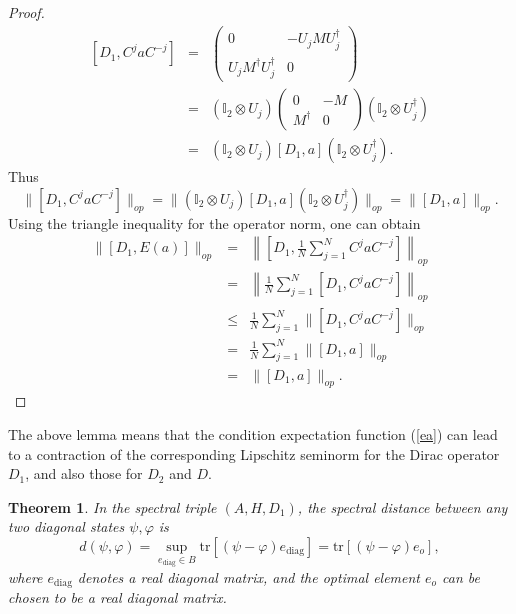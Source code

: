 \documentclass[a4paper,11pt]{article}
\newtheorem{theorem}{Theorem}
\begin{document}
\begin{proof}
  \begin{eqnarray}
    {}[D_1, C^j a C^{- j}] & = &  \left( \begin{array}{cc}
      0 & - U_j MU_j^{\dag}\\
      U_j M^{\dag} U_j^{\dag} & 0
    \end{array} \right) \nonumber\\
    & = & (\mathbb{I}_2 \otimes U_j)   \left(
    \begin{array}{cc}
      0 & - M\\
      M^{\dag} & 0
    \end{array} \right)  (\mathbb{I}_2 \otimes U_j^{\dag}) \nonumber\\
    & = & (\mathbb{I}_2 \otimes U_j) [D_1, a]  (\mathbb{I}_2 \otimes
    U_j^{\dag}) . 
  \end{eqnarray}
  Thus
  \begin{equation}
    \|[D_1, C^j a C^{- j}]\|_{op} = \|(\mathbb{I}_2
    \otimes U_j) [D_1, a] (\mathbb{I}_2 \otimes U_j^{\dag})\|_{op} = \|[D_1,
    a]\|_{op} .
  \end{equation}
  Using the triangle inequality for the operator norm, one can obtain
  \begin{eqnarray}
    \|[D_1, E (a)]\|_{op} & = & \left\| \left[ D_1, \frac{1}{N}  \sum_{j =
    1}^N C^j a C^{- j} \right] \right\|_{op} \nonumber\\
    & = & \left\| \frac{1}{N}  \sum_{j = 1}^N [D_1, C^j a C^{- j}]
    \right\|_{op} \nonumber\\
    & \leqslant & \frac{1}{N}  \sum_{j = 1}^N \|[D_1, C^j a C^{- j}]\|_{op}
    \nonumber\\
    & = & \frac{1}{N}  \sum_{j = 1}^N \|[D_1, a]\|_{op} \nonumber\\
    & = & \|[D_1, a]\|_{op} . 
  \end{eqnarray}
  
\end{proof}

The above lemma means that the condition expectation function (\ref{ea}) can lead to a contraction of the corresponding Lipschitz seminorm for the Dirac operator $D_1$, and also those for $D_2$ and $D$.

\begin{theorem}\label{th2}
  In the spectral triple $(A, H, D_1)$, the spectral distance between any two
  diagonal states $\psi, \varphi$ is
  \begin{equation}
    d (\psi, \varphi) = \sup_{e_{\mathrm{diag}} \in B}  \mathrm{tr} [(\psi -
    \varphi) e_{\mathrm{diag}}] = \mathrm{tr} [(\psi - \varphi) e_o] ,
  \end{equation}
  where $e_{\mathrm{diag}}$ denotes a real diagonal matrix, and the optimal
  element $e_o$ can be chosen to be a real diagonal matrix.
\end{theorem}
\end{document}
